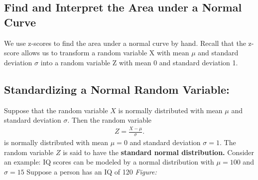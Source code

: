 \documentclass{report}
\begin{document}
    \bigbreak \noindent \bigbreak \noindent 
    \subsection*{Find and Interpret the Area under a Normal Curve}
    \bigbreak \noindent 
    We use z-scores to find the area under a normal curve by hand. Recall that the z-score allows us to transform a random variable X with mean $\mu$ and standard deviation $\sigma $ into a random variable Z with mean 0 and standard deviation 1.

    \pagebreak 
    \subsection*{Standardizing a Normal Random Variable:}
    \bigbreak \noindent 
        Suppose that the random variable $X$ is normally distributed with mean $\mu$ and standard deviation $\sigma$.
    \bigbreak \noindent 
    Then the random variable 
    \begin{align*}
        Z = \frac{X - \mu}{\sigma}
    .\end{align*}
    is normally distributed with mean $\mu = 0$ and standard deviation $\sigma = 1$.
    \bigbreak \noindent 
    The random variable $Z$ is said to have the \textbf{standard normal distribution.}
        \bigbreak \noindent 
    Consider an example:
    \bigbreak \noindent 
    IQ scores can be modeled by a normal distribution with $\mu = 100 $ and $\sigma = 15$ Suppose a person has an IQ of 120
    \bigbreak \noindent 
    \textit{Figure:}
    \bigbreak \noindent 
\end{document}
